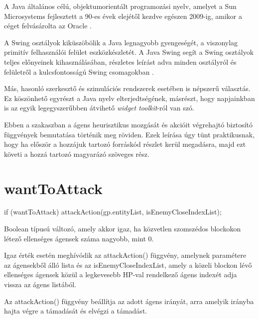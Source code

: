 


A Java általános célú, objektumorientált programozási nyelv, amelyet a Sun Microsystems fejlesztett a 90-es évek elejétől kezdve egészen 2009-ig, amikor a céget felvásárolta az Oracle \cite{arnold2005java}.


A Swing osztályok kiküszöbölik a Java legnagyobb gyengeségét, a viszonylag primitív felhasználói felület eszközkészletét. A Java Swing segít a Swing osztályok teljes előnyeinek kihasználásában,
részletes leírást adva minden osztályról és felületről a kulcsfontosságú Swing csomagokban \cite{10.5555/291162}.

Más, hasonló szerkesztő és szimulációs rendszerek esetében is népszerű választás. Ez köszönhető egyrészt a Java nyelv elterjedtségének, másrészt, hogy napjainkban is az egyik legegyszerűbben átvihető \textit{widget toolkit}-ról van szó.


Ebben a szakaszban a ágens heurisztikus mozgását és akcióit végrehajtó biztosító függvények bemutatása történik meg röviden. Ezek leírása úgy tünt praktikusnak, hogy ha először a hozzájuk tartozó forráskód részlet kerül megadásra, majd ezt követi a hozzá tartozó magyarázó szöveges rész.

\section{wantToAttack}

\begin{java}
if (wantToAttack) {
    attackAction(gp.entityList, isEnemyCloseIndexList);
}    
\end{java}

Boolean típusú változó, amely akkor igaz, ha közvetlen szomszédos blockokon létező
ellenséges ágensek száma nagyobb, mint 0.

Igaz érték esetén meghívódik az attackAction() függvény, amelynek paramétere az ágensekből álló lista és 
az isEnemyCloseIndexList, amely a közeli blockon lévő ellenséges ágensek közül a legkevesebb
HP-val rendelkező ágens indexét adja vissza az ágens listából.

Az attackAction() függvény beállítja az adott ágens irányát, arra amelyik irányba hajta végre a támadását és 
elvégzi a támadást.


